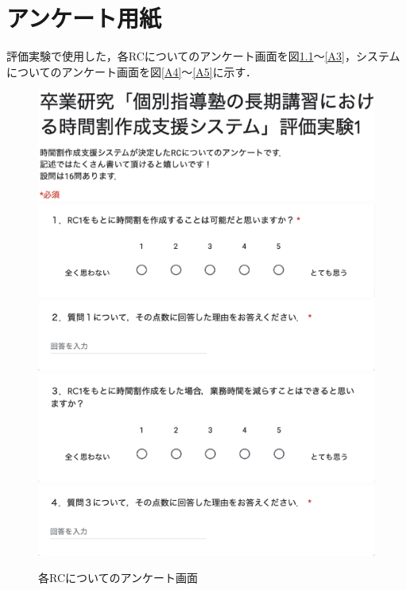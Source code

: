 \chapter{アンケート用紙}
評価実験で使用した，各RCについてのアンケート画面を図\ref{A1}〜\ref{A3}，システムについてのアンケート画面を図\ref{A4}〜\ref{A5}に示す．

\begin{figure}[htbp]
\begin{center}
\includegraphics[scale=0.5]{image/questionA/a1.eps}
\includegraphics[scale=0.5]{image/questionA/a2.eps}
\includegraphics[scale=0.5]{image/questionA/a3.eps}
\includegraphics[scale=0.5]{image/questionA/a4.eps}
\includegraphics[scale=0.5]{image/questionA/a5.eps}
\caption{各RCについてのアンケート画面}
\label{A1}
\end{center}
\end{figure}

